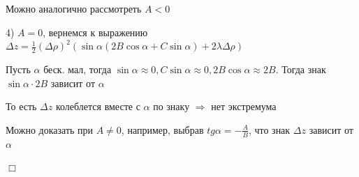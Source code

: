\documentclass[12pt]{article}
\begin{document}
    \Nota Можно аналогично рассмотреть $A < 0$

    4) $A = 0$, вернемся к выражению $\Delta z = \frac{1}{2} (\Delta \rho)^2 (\sin\alpha(2B\cos\alpha + C\sin\alpha) + 2\lambda\Delta\rho)$

    Пусть $\alpha$ беск. мал, тогда $\sin\alpha \approx 0, C\sin\alpha \approx 0, 2B\cos\alpha \approx 2B$. Тогда знак $\sin\alpha \cdot 2B$ зависит от $\alpha$

    То есть $\Delta z$ колеблется вместе с $\alpha$ по знаку $\Longrightarrow$ нет экстремума

    Можно доказать при $A \neq 0$, например, выбрав $tg \alpha = -\frac{A}{B}$, что знак $\Delta z$ зависит от $\alpha$

    $\Box$
\end{document}
